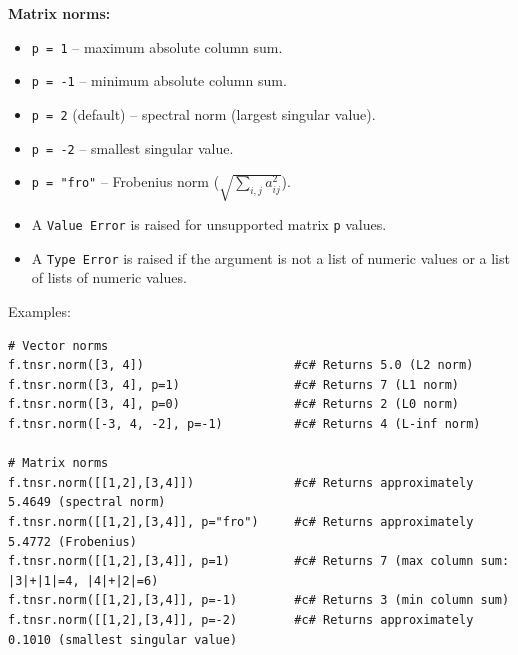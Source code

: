 \textbf{Matrix norms:}
\begin{itemize}
\item \texttt{p = 1} -- maximum absolute column sum.
\item \texttt{p = -1} -- minimum absolute column sum.
\item \texttt{p = 2} (default) -- spectral norm (largest singular value).
\item \texttt{p = -2} -- smallest singular value.
\item \texttt{p = "fro"} -- Frobenius norm ($\sqrt{\sum_{i,j} a_{ij}^2}$).
\item A \texttt{Value Error} is raised for unsupported matrix \texttt{p} values.
\end{itemize}

\begin{itemize}
\item A \texttt{Type Error} is raised if the argument is not a list of numeric values or a list of lists of numeric values.
\end{itemize}
Examples:
\begin{verbatim}
# Vector norms
f.tnsr.norm([3, 4])                     #c# Returns 5.0 (L2 norm)
f.tnsr.norm([3, 4], p=1)                #c# Returns 7 (L1 norm)
f.tnsr.norm([3, 4], p=0)                #c# Returns 2 (L0 norm)
f.tnsr.norm([-3, 4, -2], p=-1)          #c# Returns 4 (L-inf norm)

# Matrix norms
f.tnsr.norm([[1,2],[3,4]])              #c# Returns approximately 5.4649 (spectral norm)
f.tnsr.norm([[1,2],[3,4]], p="fro")     #c# Returns approximately 5.4772 (Frobenius)
f.tnsr.norm([[1,2],[3,4]], p=1)         #c# Returns 7 (max column sum: |3|+|1|=4, |4|+|2|=6)
f.tnsr.norm([[1,2],[3,4]], p=-1)        #c# Returns 3 (min column sum)
f.tnsr.norm([[1,2],[3,4]], p=-2)        #c# Returns approximately 0.1010 (smallest singular value)
\end{verbatim}

